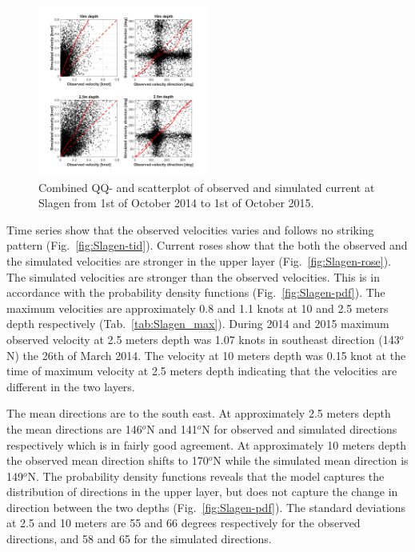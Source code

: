 \documentclass[12pt,a4paper,english]{article}
\begin{document}
\begin{figure}[ht]
\centerline{
\includegraphics*[trim=0cm 0cm 0cm 0cm,clip=true,width=0.5\textwidth]{Figurer/Slagen_QQ}}
\caption{\small
Combined QQ- and scatterplot of observed and simulated current at Slagen from 1st of October 2014 to 1st of October 2015.}
\label{fig:Slagen_QQ}
\end{figure}

Time series show that the observed velocities varies and follows no striking pattern (Fig.~\ref{fig:Slagen-tid}).
Current roses show that the both the observed and the simulated velocities are stronger in the upper layer (Fig.~\ref{fig:Slagen-rose}). The simulated velocities are stronger than the observed velocities. This is in accordance with the probability density functions (Fig.~\ref{fig:Slagen-pdf}). The maximum velocities are approximately 0.8 and 1.1 knots at 10 and 2.5 meters depth respectively (Tab.~\ref{tab:Slagen_max}). During 2014 and 2015 maximum observed velocity at 2.5 meters depth was 1.07 knots in southeast direction (143$^o$N) the 26th of March 2014. The velocity at 10 meters depth was 0.15 knot at the time of maximum velocity at 2.5 meters depth indicating that the velocities are different in the two layers.

The mean directions are to the south east. At approximately 2.5 meters depth the mean directions are 146$^o$N and 141$^o$N for observed and simulated directions respectively which is in fairly good agreement. At approximately 10 meters depth the observed mean direction shifts to 170$^o$N while the simulated mean direction is 149$^o$N. The probability density functions reveals that the model captures the distribution of directions in the upper layer, but does not capture the change in direction between the two depths (Fig.~\ref{fig:Slagen-pdf}). The standard deviations  at 2.5 and 10 meters are 55 and 66 degrees respectively for the observed directions, and 58 and 65 for the simulated directions.
\end{document}
